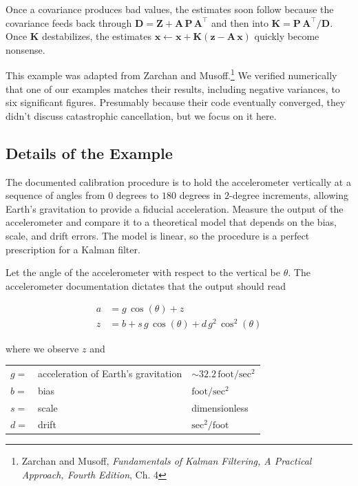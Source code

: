 \documentclass[10pt,oneside,x11names]{article}
\begin{document}
Once a covariance produces bad values, the estimates soon follow because the
covariance feeds back through
\(\mathbold{D}=\mathbold{Z}+\mathbold{A}\,\mathbold{P}\,\mathbold{A}^\intercal\)
and then into \(\mathbold{K}=\mathbold{P}\,\mathbold{A}^\intercal/\mathbold{D}\).
Once \(\mathbold{K}\) destabilizes, the estimates
\(\mathbold{x}\leftarrow\mathbold{x}+\mathbold{K}(\mathbold{z}-\mathbold{A}\,\mathbold{x})\)
quickly become nonsense.

This example was adapted from Zarchan and Musoff.\footnote{Zarchan and Musoff, \emph{Fundamentals of Kalman Filtering, A Practical
Approach, Fourth Edition}, Ch. 4} We verified
numerically that one of our examples matches their results, including negative
variances, to six significant figures. Presumably because their code eventually
converged, they didn't discuss catastrophic cancellation, but we focus on it
here.

\subsection{Details of the Example}
\label{sec:orgheadline23}

The documented calibration procedure is to hold the accelerometer vertically at
a sequence of angles from \(0\) degrees to \(180\) degrees in \(2\)-degree
increments, allowing Earth's gravitation to provide a fiducial acceleration.
Measure the output of the accelerometer and compare it to a theoretical model
that depends on the bias, scale, and drift errors. The model is linear, so the
procedure is a perfect prescription for a Kalman filter.

Let the angle of the accelerometer with respect to the vertical be \(\theta\). The
accelerometer documentation dictates that the output should read

\begin{align}
a &= g \,\cos(\theta) + z \\
\label{eqn:accelerometer-observations}
z &= b + s\, g\, \cos(\theta) + d\, g^2 \,\cos^2(\theta)
\end{align}

\noindent where we observe \(z\) and

\begin{center}
\begin{tabular}{lll}
\(g=\) & acceleration of Earth's gravitation & \(\sim 32.2 \,\textrm{foot}/\textrm{sec}^2\)\\
\(b=\) & bias & \(\textrm{foot} / \textrm{sec}^2\)\\
\(s=\) & scale & dimensionless\\
\(d=\) & drift & \(\textrm{sec}^2 / \textrm{foot}\)\\
\end{tabular}
\end{center}
\end{document}
